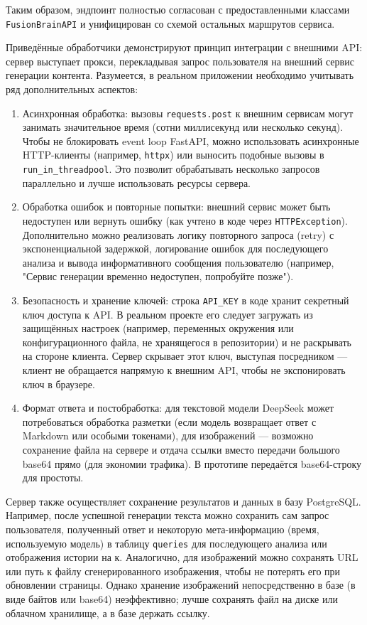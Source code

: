 Таким образом, эндпоинт полностью согласован с предоставленными классами
\texttt{FusionBrainAPI} и унифицирован со схемой остальных маршрутов сервиса.

Приведённые обработчики демонстрируют принцип интеграции с внешними API: сервер выступает прокси, перекладывая запрос пользователя на внешний сервис генерации контента. Разумеется, в реальном приложении необходимо учитывать ряд дополнительных аспектов:
\begin{enumerate}[label=\arabic*]
\item Асинхронная обработка: вызовы \verb|requests.post| к внешним сервисам могут занимать значительное время (сотни миллисекунд или несколько секунд). Чтобы не блокировать event loop FastAPI, можно использовать асинхронные HTTP-клиенты (например, \verb|httpx|) или выносить подобные вызовы в \verb|run_in_threadpool|. Это позволит обрабатывать несколько запросов параллельно и лучше использовать ресурсы сервера.
\item Обработка ошибок и повторные попытки: внешний сервис может быть недоступен или вернуть ошибку (как учтено в коде через \verb|HTTPException|). Дополнительно можно реализовать логику повторного запроса (retry) с экспоненциальной задержкой, логирование ошибок для последующего анализа и вывода информативного сообщения пользователю (например, "Сервис генерации временно недоступен, попробуйте позже").
\item Безопасность и хранение ключей: строка \verb|API_KEY| в коде хранит секретный ключ доступа к API. В реальном проекте его следует загружать из защищённых настроек (например, переменных окружения или конфигурационного файла, не хранящегося в репозитории) и не раскрывать на стороне клиента. Сервер скрывает этот ключ, выступая посредником — клиент не обращается напрямую к внешним API, чтобы не экспонировать ключ в браузере.
\item Формат ответа и постобработка: для текстовой модели DeepSeek может потребоваться обработка разметки (если модель возвращает ответ с Markdown или особыми токенами), для изображений — возможно сохранение файла на сервере и отдача ссылки вместо передачи большого base64 прямо (для экономии трафика). В прототипе передаётся base64-строку для простоты.
\end{enumerate}

Сервер также осуществляет сохранение результатов и данных в базу PostgreSQL. Например, после успешной генерации текста можно сохранить сам запрос пользователя, полученный ответ и некоторую мета-информацию (время, используемую модель) в таблицу \verb|queries| для последующего анализа или отображения истории на к. Аналогично, для изображений можно сохранять URL или путь к файлу сгенерированного изображения, чтобы не потерять его при обновлении страницы. Однако хранение изображений непосредственно в базе (в виде байтов или base64) неэффективно; лучше сохранять файл на диске или облачном хранилище, а в базе держать ссылку.

